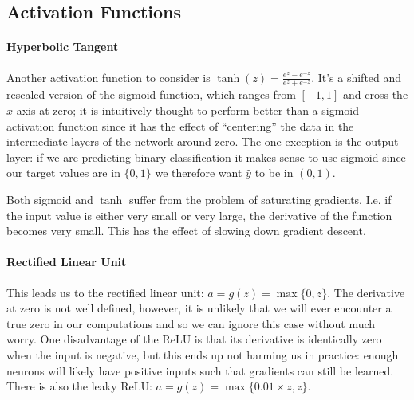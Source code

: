 \documentclass[12pt]{article}
\begin{document}
\subsection{Activation Functions}
\paragraph{Hyperbolic Tangent}
Another activation function to consider is $\tanh (z) = \frac{e^z - e^{-z}}{e^z + e^{-z}}$. It's a shifted and rescaled version of the sigmoid function, which ranges from $[-1, 1]$ and cross the $x$-axis at zero; it is intuitively thought to perform better than a sigmoid activation function since it has the effect of ``centering'' the data in the intermediate layers of the network around zero. The one exception is the output layer: if we are predicting binary classification it makes sense to use sigmoid since our target values are in $\{0, 1\}$ we therefore want $\hat y$ to be in $(0,1)$.

\begin{figure}[h]
  \centering   
     \end{figure}
Both sigmoid and $\tanh$ suffer from the problem of saturating gradients. I.e. if the input value is either very small or very large, the derivative of the function becomes very small. This has the effect of slowing down gradient descent.

\paragraph{Rectified Linear Unit}
This leads us to the rectified linear unit: $a = g(z) = \max\{0, z\}$. The derivative at zero is not well defined, however, it is unlikely that we will ever encounter a true zero in our computations and so we can ignore this case without much worry. One disadvantage of the ReLU is that its derivative is identically zero when the input is negative, but this ends up not harming us in practice: enough neurons will likely have positive inputs such that gradients can still be learned. There is also the leaky ReLU: $a = g(z) = \max\{0.01 \times z, z\}$.

\begin{figure}[h]
  \centering   
\end{figure}
\end{document}
